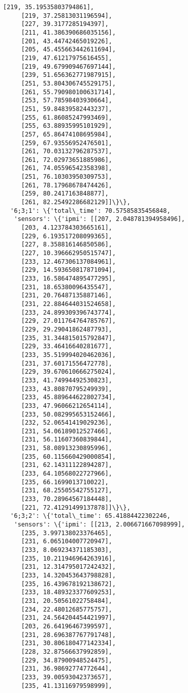 \documentclass[11pt]{article}
\begin{document}
\begin{tcolorbox}[breakable, size=fbox, boxrule=.5pt, pad at break*=1mm, opacityfill=0]
\begin{Verbatim}[commandchars=\\\{\}]
     [219, 35.19535803794861],
     [219, 37.25813031196594],
     [227, 39.3177285194397],
     [211, 41.386390686035156],
     [201, 43.44742465019226],
     [205, 45.455663442611694],
     [219, 47.61217975616455],
     [219, 49.679909467697144],
     [239, 51.656362771987915],
     [251, 53.804306745529175],
     [261, 55.790980100631714],
     [253, 57.78598403930664],
     [251, 59.84839582443237],
     [255, 61.86085247993469],
     [255, 63.88935995101929],
     [257, 65.86474108695984],
     [259, 67.93556952476501],
     [261, 70.03132796287537],
     [261, 72.02973651885986],
     [261, 74.05596542358398],
     [251, 76.10303950309753],
     [261, 78.17968678474426],
     [259, 80.2417163848877],
     [261, 82.25492286682129]]\}\},
  '6;3;1': \{'total\_time': 70.57585835456848,
   'sensors': \{'ipmi': [[207, 2.048781394958496],
     [203, 4.123784303665161],
     [229, 6.193517208099365],
     [227, 8.358816146850586],
     [227, 10.396662950515747],
     [233, 12.467306137084961],
     [229, 14.593650817871094],
     [233, 16.586474895477295],
     [231, 18.65380096435547],
     [231, 20.76487135887146],
     [231, 22.884644031524658],
     [233, 24.899309396743774],
     [229, 27.011764764785767],
     [229, 29.29041862487793],
     [235, 31.344815015792847],
     [229, 33.46416640281677],
     [233, 35.519994020462036],
     [231, 37.60171556472778],
     [229, 39.670610666275024],
     [233, 41.74994492530823],
     [233, 43.80870795249939],
     [233, 45.889644622802734],
     [233, 47.96066212654114],
     [233, 50.082995653152466],
     [232, 52.06541419029236],
     [231, 54.06189012527466],
     [231, 56.11607360839844],
     [231, 58.08913230895996],
     [235, 60.115660429000854],
     [231, 62.14311122894287],
     [233, 64.10568022727966],
     [235, 66.1699013710022],
     [231, 68.25505542755127],
     [233, 70.28964567184448],
     [221, 72.41291499137878]]\}\},
  '6;3;2': \{'total\_time': 65.41884422302246,
   'sensors': \{'ipmi': [[213, 2.006671667098999],
     [235, 3.997138023376465],
     [231, 6.065104007720947],
     [233, 8.069234371185303],
     [235, 10.211946964263916],
     [231, 12.314795017242432],
     [233, 14.320453643798828],
     [235, 16.439678192138672],
     [233, 18.489323377609253],
     [231, 20.50561022758484],
     [234, 22.48012685775757],
     [231, 24.564204454421997],
     [203, 26.64196467399597],
     [231, 28.696387767791748],
     [231, 30.806180477142334],
     [228, 32.87566637992859],
     [229, 34.87900948524475],
     [231, 36.98692774772644],
     [233, 39.00593042373657],
     [235, 41.13116979598999],

\end{Verbatim}
\end{tcolorbox}
\end{document}

